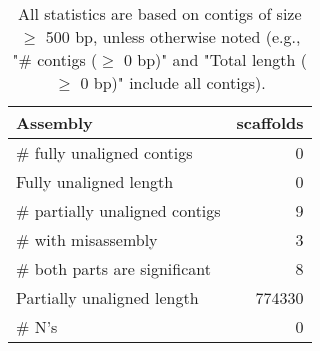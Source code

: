 \documentclass[12pt,a4paper]{article}
\begin{document}
\begin{table}[ht]
\begin{center}
\caption{All statistics are based on contigs of size $\geq$ 500 bp, unless otherwise noted (e.g., "\# contigs ($\geq$ 0 bp)" and "Total length ($\geq$ 0 bp)" include all contigs).}
\begin{tabular}{|l*{1}{|r}|}
\hline
Assembly & scaffolds \\ \hline
\# fully unaligned contigs & 0 \\ \hline
Fully unaligned length & 0 \\ \hline
\# partially unaligned contigs & 9 \\ \hline
\hspace{5mm}\# with misassembly & 3 \\ \hline
\hspace{5mm}\# both parts are significant & 8 \\ \hline
Partially unaligned length & 774330 \\ \hline
\# N's & 0 \\ \hline
\end{tabular}
\end{center}
\end{table}
\end{document}
